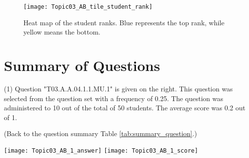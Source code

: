 \documentclass[12pt,english,nohyper]{tufte-handout}\usepackage[]{graphicx}\usepackage[]{color}
\makeatletter
\newenvironment{kframe}{%
 \def\at@end@of@kframe{}%
 \ifinner\ifhmode%
  \def\at@end@of@kframe{\end{minipage}}%
  \begin{minipage}{\columnwidth}%
 \fi\fi%
 \def\FrameCommand##1{\hskip\@totalleftmargin \hskip-\fboxsep
 \colorbox{shadecolor}{##1}\hskip-\fboxsep
     \hskip-\linewidth \hskip-\@totalleftmargin \hskip\columnwidth}%
 \MakeFramed {\advance\hsize-\width
   \@totalleftmargin\z@ \linewidth\hsize
   \@setminipage}}%
 {\par\unskip\endMakeFramed%
 \at@end@of@kframe}
\makeatother
\begin{document}
\begin{kframe}

{\ttfamily\noindent\color{warningcolor}{\#\# Warning: Non Lab interpolation is deprecated}}\end{kframe}\begin{center}
\begin{wrapfigure}{o}{0.95\columnwidth}
\begin{centering}
\texttt{[image: Topic03\_AB\_tile\_student\_rank]}
\par\end{centering}
\caption{\label{fig:LearningObj_rank}Heat map of the student ranks. Blue represents the top rank, while yellow means the bottom.}
\end{wrapfigure}\par\end{center}


\clearpage
\newpage{}
\section{Summary of Questions}


 (1) Question "T03.A.A.04.1.1.MU.1" is given on the right. This question was selected from the question set with a frequency of 0.25. The question was administered to 10 out of the total of 50 students. The average score was 0.2 out of 1.

 (Back to the question summary Table \ref{tab:summary_question}.)

\begin{center} \texttt{[image: Topic03\_AB\_1\_answer]} \texttt{[image: Topic03\_AB\_1\_score]} \end{center} 
\end{document}
